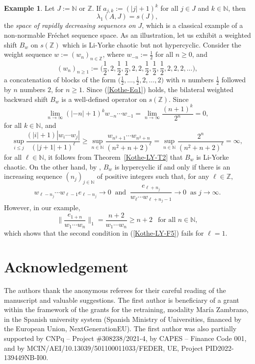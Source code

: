 \documentclass[12pt]{amsart}
\theoremstyle{theorem}
\theoremstyle{definition}
\newtheorem{example}[theorem]{Example}
\theoremstyle{remark} \theoremstyle{question} \theoremstyle{example}
\newcommand{\N}{\mathbb{N}}
\newcommand{\Z}{\mathbb{Z}}
\begin{document}
\begin{example}
Let $J\!:= \N$ or $\Z$. If $a_{j,k}\!:= (|j| + 1)^k$ for all $j \in J$ and $k \in \N$, then
\[
\lambda_1(A,J) = s(J),
\]
the {\em space of rapidly decreasing sequences on $J$}, which is a classical example of a non-normable Fr\'echet sequence space.
As an illustration, let us exhibit a weighted shift $B_w$ on $s(\Z)$ which is Li-Yorke chaotic but not hypercyclic.
Consider the weight sequence $w\!:= (w_n)_{n \in \Z}$, where $w_{-n}\!:= \frac{1}{2}$ for all $n \geq 0$, and
\[
(w_n)_{n \geq 1}\!:= \Big(\frac{1}{2},2,\frac{1}{2},\frac{1}{2},2,2,\frac{1}{2},\frac{1}{2},\frac{1}{2},2,2,2,\ldots\Big),
\]
a concatenation of blocks of the form $\big(\frac{1}{2},\ldots,\frac{1}{2},2,\ldots,2\big)$ 
with $n$ numbers $\frac{1}{2}$ followed by $n$ numbers $2$, for $n \geq 1$.
Since (\ref{Kothe-Eq1}) holds, the bilateral weighted backward shift $B_w$ is a well-defined operator on $s(\Z)$.
Since
\[
\lim_{n \to \infty} (|-n|+1)^k w_{-n} \cdots w_{-1} = \lim_{n \to \infty} \frac{(n+1)^k}{2^n} = 0,
\]
for all $k \in \N$, and
\[
\sup_{i \leq j} \frac{(|i|+1) |w_i \cdots w_j|}{(|j+1| + 1)^\ell}
\geq \sup_{n \in \N} \frac{w_{n^2+1} \cdots w_{n^2+n}}{(n^2+n+2)^\ell}
= \sup_{n \in \N} \frac{2^n}{(n^2+n+2)^\ell} = \infty,
\]
for all $\ell \in \N$, it follows from Theorem~\ref{Kothe-LY-T2} that $B_w$ is Li-Yorke chaotic.
On the other hand, by \cite[Theorem~4.13]{KGroAPer11}, $B_w$ is hypercyclic if and only if there is an increasing sequence
$(n_j)_{j \in \N}$ of positive integers such that, for any $\ell \in \Z$,
\begin{equation}\label{Kothe-LY-F5}
w_{\ell - n_j} \cdots w_{\ell - 1} e_{\ell - n_j} \to 0 \ \text{ and } \ \frac{e_{\ell + n_j}}{w_\ell \cdots w_{\ell + n_j -1}} \to 0
\ \text{ as } j \to \infty.
\end{equation}
However, in our example,
\[
\Big\|\frac{e_{1 + n}}{w_1 \cdots w_n}\Big\|_1 = \frac{n+2}{w_1 \cdots w_n} \geq n + 2 \ \ \text{ for all } n \in \N,
\]
which shows that the second condition in (\ref{Kothe-LY-F5}) fails for $\ell = 1$.
\end{example}


\section*{Acknowledgement}

The authors thank the anonymous referees for their careful reading of the manuscript and valuable suggestions. 
The first author is beneficiary of a grant within the framework of the grants for the retraining, modality Mar\'ia Zambrano, 
in the Spanish university system (Spanish Ministry of Universities, financed by the European Union, NextGenerationEU).
The first author was also partially supported by CNPq -- Project {\#}308238/2021-4, by CAPES -- Finance Code 001,
and by MCIN/AEI/10.13039/501100011033/FEDER, UE, Project PID2022-139449NB-I00.
\end{document}
